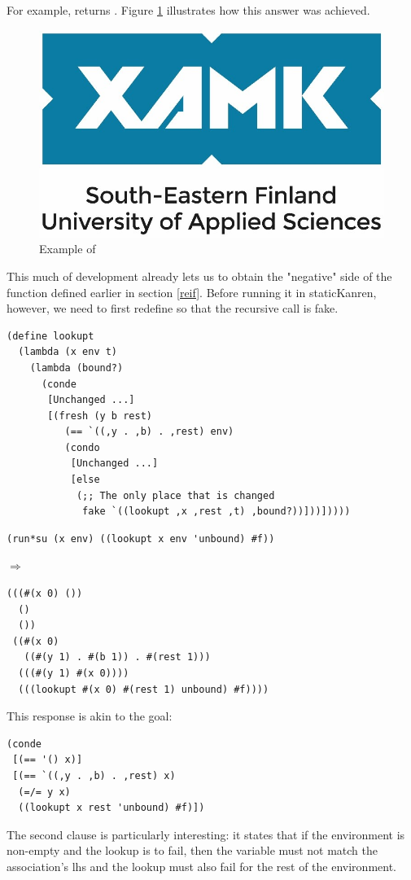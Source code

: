 For example,  returns . Figure \ref{fig:run*su} illustrates how this answer was achieved.
\begin{figure}[h]
    \centering
    \includegraphics{figures/logo.jpg}
    \caption{Example of }
    \label{fig:run*su}
\end{figure}

This much of development already lets us to obtain the "negative" side of the  function defined earlier in section \ref{reif}. Before running it in staticKanren, however, we need to first redefine  so that the recursive call is fake.
\begin{lstlisting}
(define lookupt
  (lambda (x env t)
    (lambda (bound?)
      (conde
       [Unchanged ...]
       [(fresh (y b rest)
          (== `((,y . ,b) . ,rest) env)
          (condo
           [Unchanged ...]
           [else
            (;; The only place that is changed
             fake `((lookupt ,x ,rest ,t) ,bound?))]))]))))
\end{lstlisting}

\begin{lstlisting}
(run*su (x env) ((lookupt x env 'unbound) #f))
\end{lstlisting}
$\Rightarrow$
\begin{lstlisting}
(((#(x 0) ())
  () 
  ())
 ((#(x 0) 
   ((#(y 1) . #(b 1)) . #(rest 1)))
  (((#(y 1) #(x 0))))
  (((lookupt #(x 0) #(rest 1) unbound) #f))))
\end{lstlisting}
This response is akin to the goal:
\begin{lstlisting}
(conde
 [(== '() x)]
 [(== `((,y . ,b) . ,rest) x)
  (=/= y x)
  ((lookupt x rest 'unbound) #f)])
\end{lstlisting}
The second clause is particularly interesting: it states that if the environment is non-empty and the lookup is to fail, then the variable  must not match the association's lhs and the lookup must also fail for the rest of the environment.

